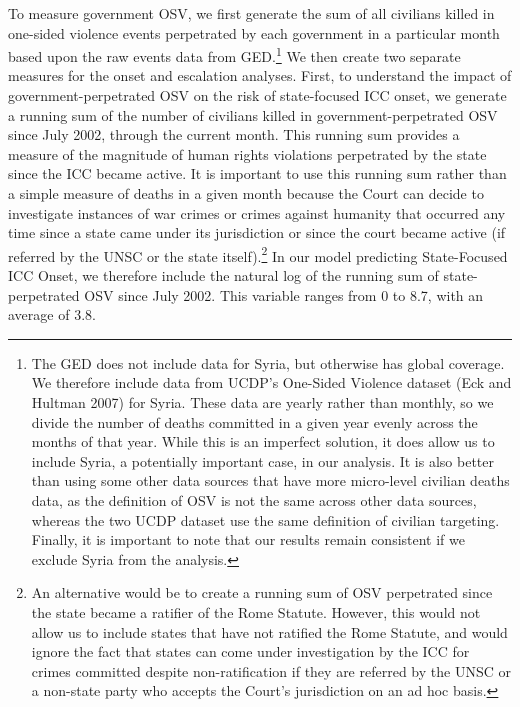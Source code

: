 To measure government OSV, we first generate the sum of all civilians killed in one-sided violence events perpetrated by each government in a particular month based upon the raw events data from GED.\footnote{The GED does not include data for Syria, but otherwise has global coverage. We therefore include data from UCDP's One-Sided Violence dataset (Eck and Hultman 2007) for Syria. These data are yearly rather than monthly, so we divide the number of deaths committed in a given year evenly across the months of that year. While this is an imperfect solution, it does allow us to include Syria, a potentially important case, in our analysis. It is also better than using some other data sources that have more micro-level civilian deaths data, as the definition of OSV is not the same across other data sources, whereas the two UCDP dataset use the same definition of civilian targeting. Finally, it is important to note that our results remain consistent if we exclude Syria from the analysis.} We then create two separate measures for the onset and escalation analyses. First, to understand the impact of government-perpetrated OSV on the risk of state-focused ICC onset, we generate a running sum of the number of civilians killed in government-perpetrated OSV since July 2002, through the current month. This running sum provides a measure of the magnitude of human rights violations perpetrated by the state since the ICC became active. It is important to use this running sum rather than a simple measure of deaths in a given month because the Court can decide to investigate instances of war crimes or crimes against humanity that occurred any time since a state came under its jurisdiction or since the court became active (if referred by the UNSC or the state itself).\footnote{An alternative would be to create a running sum of OSV perpetrated since the state became a ratifier of the Rome Statute. However, this would not allow us to include states that have not ratified the Rome Statute, and would ignore the fact that states can come under investigation by the ICC for crimes committed despite non-ratification if they are referred by the UNSC or a non-state party who accepts the Court's jurisdiction on an ad hoc basis.} In our model predicting State-Focused ICC Onset, we therefore include the natural log of the running sum of state-perpetrated OSV since July 2002. This variable ranges from 0 to 8.7, with an average of 3.8.

